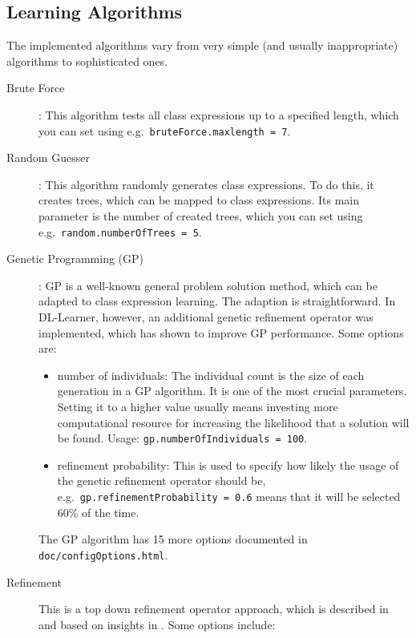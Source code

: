 \documentclass[a4paper,12pt]{scrartcl}
\begin{document}
\subsection{Learning Algorithms}

The implemented algorithms vary from very simple (and usually inappropriate) algorithms to sophisticated ones. 

\begin{description}
 \item[Brute Force]: This algorithm tests all class expressions up to a specified length, which you can set using e.g.~\verb|bruteForce.maxlength = 7|.
 \item[Random Guesser]: This algorithm randomly generates class expressions. To do this, it creates trees, which can be mapped to class expressions. Its main parameter is the number of created trees, which you can set using e.g.~\verb|random.numberOfTrees = 5|.
 \item[Genetic Programming (GP)]: GP is a well-known general problem solution method, which can be adapted to class expression learning. The adaption is straightforward. In DL-Learner, however, an additional genetic refinement operator was implemented, which has shown to improve GP performance\cite{hybrid_gp}. Some options are:
 \begin{itemize}
  \item number of individuals: The individual count is the size of each generation in a GP algorithm. It is one of the most crucial parameters. Setting it to a higher value usually means investing more computational resource for increasing the likelihood that a solution will be found. Usage: \verb|gp.numberOfIndividuals = 100|.
  \item refinement probability: This is used to specify how likely the usage of the genetic refinement operator should be, e.g.~\verb|gp.refinementProbability = 0.6| means that it will be selected 60\% of the time.
 \end{itemize}
 The GP algorithm has 15 more options documented in \verb|doc/configOptions.html|.
 \item[Refinement] This is a top down refinement operator approach, which is described in \cite{alc_learning_algorithm} and based on insights in \cite{property_analysis}. Some options include:

\end{description}
\end{document}
